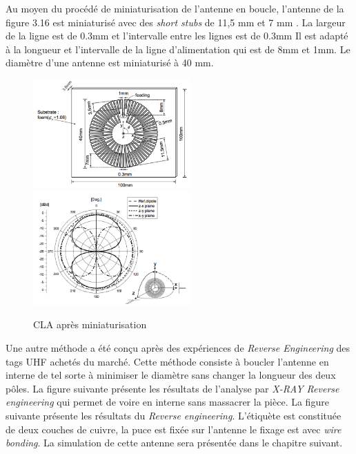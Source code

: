 \documentclass[11pt, a4paper, twoside]{book}
\begin{document}
Au moyen du procédé de miniaturisation de l'antenne en boucle, l'antenne de la figure 3.16 est miniaturisé avec des \emph{short stubs} de 11,5 mm et 7 mm . La largeur de la ligne est de 0.3mm et l'intervalle entre les lignes est de 0.3mm
Il est adapté à la longueur et l'intervalle de la ligne d'alimentation qui est de 8mm et 1mm. Le diamètre d'une antenne est miniaturisé à 40 mm.\\
\begin{figure}[H]
\centering
\includegraphics[width=6cm]{structure}
\includegraphics[width=6cm]{structurea}
\caption{CLA après miniaturisation}
\end{figure}

Une autre méthode a été conçu après des expériences de \emph{Reverse Engineering} des tags UHF achetés du marché. Cette méthode consiste à boucler l'antenne en interne de tel sorte à minimiser le diamètre sans changer la longueur des deux pôles. La figure suivante présente les résultats de l'analyse par  \emph{X-RAY Reverse engineering} qui permet de voire en interne sans massacrer la pièce. La figure suivante présente les résultats du \emph{Reverse engineering}. L'étiquète est constituée de deux couches de cuivre, la puce est fixée sur l'antenne le fixage est avec \emph{wire bonding}. La simulation de cette antenne sera présentée dans le chapitre suivant. \\\\\\\\\\\\\\\\
\end{document}
